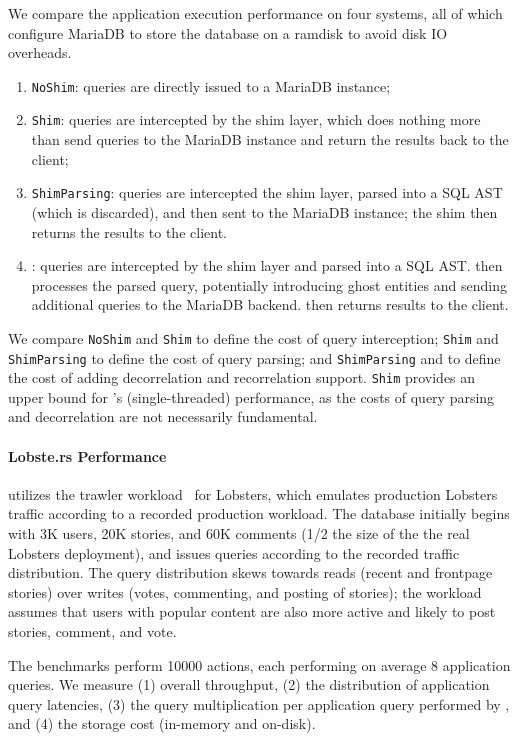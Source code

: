 We compare the application execution performance on four systems, all of which configure MariaDB to
store the database on a ramdisk to avoid disk IO overheads.
\begin{enumerate}
    \item \texttt{NoShim}: queries are directly issued to a MariaDB instance;
    \item \texttt{Shim}: queries are intercepted by the shim layer,
        which does nothing more than send queries to the MariaDB instance and
        return the results back to the client;
    \item \texttt{ShimParsing}: queries are intercepted the shim layer, parsed into a
        SQL AST (which is discarded), and then sent to the MariaDB instance; the shim then returns the results to the
        client. 
    \item \texttt{\sys{}}: queries are intercepted by the shim layer and parsed into a SQL AST. \sys{}
        then processes the parsed query, potentially introducing ghost entities and sending additional queries to the MariaDB backend.
        \sys{} then returns results to the client.
\end{enumerate}

We compare \texttt{NoShim} and \texttt{Shim} to define the cost of query interception; \texttt{Shim}
and \texttt{ShimParsing} to define the cost of query parsing; and \texttt{ShimParsing} and
\texttt{\sys{}} to define the cost of adding decorrelation and recorrelation support.  \texttt{Shim}
provides an upper bound for \sys{}'s (single-threaded) performance, as the costs of query parsing
and decorrelation are not necessarily fundamental.

\paragraph{Lobste.rs Performance}
\sys{} utilizes the trawler workload~\cite{trawler} for Lobsters, which emulates production
Lobsters traffic according to a recorded production workload. The database initially begins with 3K
users, 20K stories, and 60K comments (1/2 the size of the the real Lobsters deployment), and issues
queries according to the recorded traffic distribution. The query distribution skews towards reads
(recent and frontpage stories) over writes (votes, commenting, and posting of stories); the
workload assumes that users with popular content are also more active and likely to post stories,
comment, and vote.

The benchmarks perform 10000 actions, each performing on average 8 application queries. 
We measure (1) overall throughput, (2) the distribution of application query
latencies, (3) the query multiplication per application query performed by \sys{}, and (4) the
storage cost (in-memory and on-disk).

